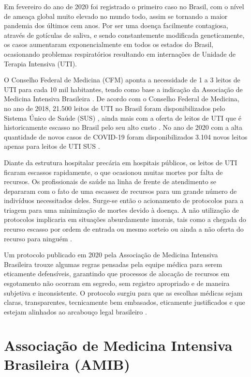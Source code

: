 \documentclass[12pt]{article}
\begin{document}
Em fevereiro do ano de 2020 foi registrado o primeiro caso no Brasil, com o nível de ameaça global muito elevado no mundo todo, assim se tornando a maior pandemia dos últimos cem anos.
Por ser uma doença facilmente contagiosa, através de gotículas de saliva, e sendo constantemente modificada geneticamente, os casos aumentaram exponencialmente em todos os estados do Brasil, ocasionando problemas respiratórios resultando em internações de Unidade de Terapia Intensiva (UTI).

O Conselho Federal de Medicina (CFM) aponta a necessidade de 1 a 3 leitos de UTI para cada 10 mil habitantes, tendo como base a indicação da Associação de Medicina Intensiva Brasileira \cite{domingues2018numero}. De acordo com o Conselho Federal de Medicina, no ano de 2018, 21.500 leitos de UTI no Brasil foram disponibilizados pelo Sistema Único de Saúde (SUS) \cite{cfm2018,cfm2020}, ainda mais com a oferta de leitos de UTI que é historicamente escasso no Brasil pelo seu alto custo \cite{murthy2015intensive}. No ano de 2020 com a alta quantidade de novos casos de COVID-19 foram disponibilizados 3.104 novos leitos apenas para leitos de UTI SUS \cite{cotrim2020crescimento}.

Diante da estrutura hospitalar precária em hospitais públicos, os leitos de UTI ficaram escassos rapidamente, o que ocasionou muitas mortes por falta de recursos. Os profissionais de saúde na linha de frente de atendimento se depararam com o fato de uma escassez de recursos para um grande número de indivíduos necessitados deles. Surge-se então o acionamento de protocolos para a triagem para uma minimização de mortes devido à doença. A não utilização de protocolos implicaria em situações absurdamente imorais, tais como a chegada do recurso escasso por ordem de entrada ou mesmo sorteio ou ainda a não oferta do recurso para ninguém \cite{costa2020protocolos}.

Um protocolo publicado em 2020 pela Associação de Medicina Intensiva Brasileira trouxe algumas regras pensadas pela equipe médica para serem eticamente defensíveis, garantindo que processos de alocação de recursos em esgotamento não ocorram em segredo, sem registro apropriado e de maneira subjetiva e inconsistente. O protocolo surgiu para que as escolhas médicas sejam claras, transparentes, tecnicamente bem embasados, eticamente justificados e que estejam alinhados ao arcabouço legal brasileiro \cite{kretzer2020protocolo}.


\section{Associação de Medicina Intensiva Brasileira (AMIB)}
\end{document}
